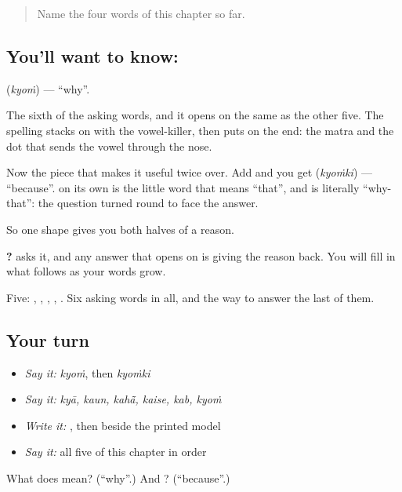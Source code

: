 \label{lesson:HI-C71-why}



\begin{quote}
Name the four words of this chapter so far.
\end{quote}

\subsection*{You'll want to know: }
\textbf{} (\emph{kyoṁ}) — \textquotedblleft{}why\textquotedblright{}.

The sixth of the asking words, and it opens on the same \textbf{} as the other five. The spelling stacks  on  with the vowel-killer, then puts  on the end: the  matra and the dot that sends the vowel through the nose.

Now the piece that makes it useful twice over. Add \textbf{} and you get \textbf{} (\emph{kyoṁki}) — \textquotedblleft{}because\textquotedblright{}.  on its own is the little word that means \textquotedblleft{}that\textquotedblright{}, and  is literally \textquotedblleft{}why-that\textquotedblright{}: the question turned round to face the answer.

So one shape gives you both halves of a reason.

\textbf{   ?} asks it, and any answer that opens on \textbf{} is giving the reason back. You will fill in what follows as your words grow.

\begin{grammarlens}[title={What you've built}]
Five: , , , , . Six asking words in all, and the way to answer the last of them.
\end{grammarlens}

\subsection*{Your turn}
\begin{itemize}
\raggedright
  \item \emph{Say it:} \emph{kyoṁ}, then \emph{kyoṁki}
  \item \emph{Say it:} \emph{kyā, kaun, kahā̃, kaise, kab, kyoṁ}
  \item \emph{Write it:} , then  beside the printed model
  \item \emph{Say it:} all five of this chapter in order
\end{itemize}

\begin{tcolorbox}[breakable,colback=teal!4,colframe=teal!35!black,title={Before you move on}]
What does  mean? (\textquotedblleft{}why\textquotedblright{}.) And ? (\textquotedblleft{}because\textquotedblright{}.)
\end{tcolorbox}
